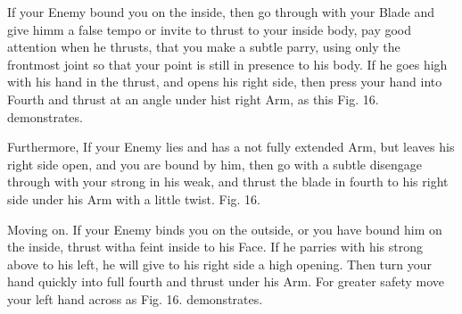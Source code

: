 \newpage


\newpage



If your Enemy bound you on the inside, then go through with your Blade
and give himm a false tempo or invite to thrust to your inside body,
pay good attention when he thrusts, that you make a subtle parry,
using only the frontmost joint so that your point is still in presence
to his body. If he goes high with his hand in the thrust, and opens
his right side, then press your hand into Fourth and thrust at an
angle under hist right Arm, as this Fig. 16. demonstrates.

\exercise{}

Furthermore, If your Enemy lies and has a not fully extended Arm, but
leaves his right side open, and you are bound by him, then go with a
subtle disengage through with your strong in his weak, and thrust the
blade in fourth to his right side under his Arm with a little
twist. Fig. 16.

\exercise{}

Moving on. If your Enemy binds you on the outside, or you have bound him on the inside, thrust witha  feint inside to his Face. If he parries with his strong above to his left, he will give to his right side a high opening. Then turn your hand quickly into full fourth and thrust under his Arm. For greater safety move your left hand across as Fig. 16. demonstrates.

